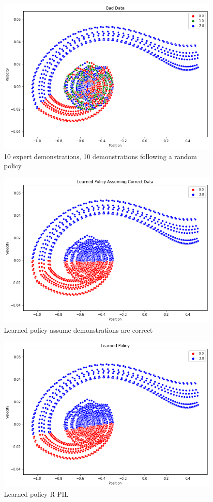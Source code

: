\documentclass[11pt]{article}
\begin{document}
\begin{figure}[H]
    \centering
    \includegraphics[scale=0.5]{RandomData.png}
    \caption{10 expert demonstrations, 10 demonstrations following a random policy}
    \label{RandomData}
\end{figure}

\begin{figure}[H]
    \centering
    \includegraphics[scale=0.5]{LearnedPolicy2Bad.png}
    \caption{Learned policy assume demonstrations are correct}
    \label{log_reg_random}
\end{figure}

\begin{figure}[H]
    \centering
    \includegraphics[scale=0.5]{LearnedPolicy2.png}
    \caption{Learned policy R-PIL}
    \label{rpil_random}
\end{figure}
\end{document}
